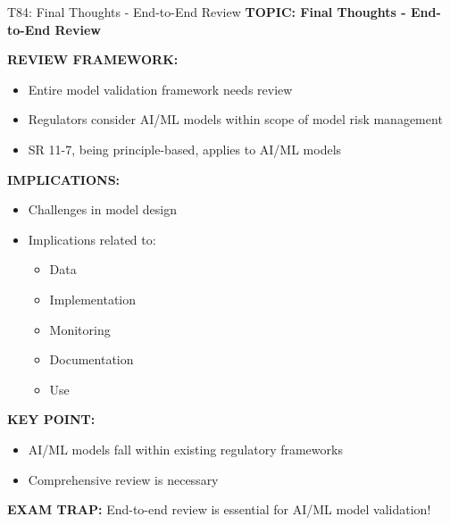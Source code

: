 \documentclass[8pt]{beamer}
\begin{document}
	\begin{frame}{T84: Final Thoughts - End-to-End Review}
		\fontsize{6.5}{7.5}\selectfont
		\textbf{TOPIC: Final Thoughts - End-to-End Review}
		
		\vspace{0.1cm}
		\textbf{REVIEW FRAMEWORK:}
		\begin{itemize}
			\item Entire model validation framework needs review
			\item Regulators consider AI/ML models within scope of model risk management
			\item SR 11-7, being principle-based, applies to AI/ML models
		\end{itemize}
		
		\vspace{0.1cm}
		\textbf{IMPLICATIONS:}
		\begin{itemize}
			\item Challenges in model design
			\item Implications related to:
			\begin{itemize}
				\item Data
				\item Implementation
				\item Monitoring
				\item Documentation
				\item Use
			\end{itemize}
		\end{itemize}
		
		\vspace{0.1cm}
		\textbf{KEY POINT:}
		\begin{itemize}
			\item AI/ML models fall within existing regulatory frameworks
			\item Comprehensive review is necessary
		\end{itemize}
		
		\textcolor{myred}{\textbf{EXAM TRAP:}} End-to-end review is \textcolor{myblue}{essential for AI/ML model validation}!
	\end{frame}
	
\end{document}
